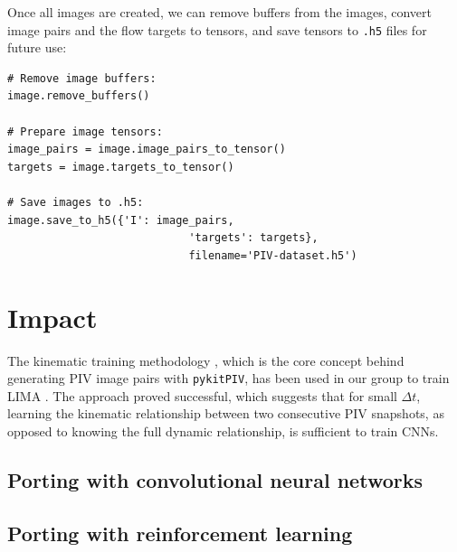 \documentclass[a4paper,fleqn]{cas-dc}
\newcommand{ \kamila}[1]{\color{blue}{Kamila: #1} \color{black}}
\begin{document}
Once all images are created, we can remove buffers from the images, convert image pairs and the flow targets to tensors, and save tensors to \texttt{.h5} files for future use:
\lstset{language=Python}
\begin{lstlisting}
# Remove image buffers:
image.remove_buffers()

# Prepare image tensors:
image_pairs = image.image_pairs_to_tensor()
targets = image.targets_to_tensor()

# Save images to .h5:
image.save_to_h5({'I': image_pairs, 
							'targets': targets}, 
							filename='PIV-dataset.h5')
\end{lstlisting}

\section{Impact} \label{sec:results}

The kinematic training methodology \cite{manickathan2022kinematic}, which is the core concept behind generating PIV image pairs with \texttt{pykitPIV}, has been used in our group to train LIMA \cite{manickathan2023lightweight, mucignat2023lightweight}. The approach proved successful, which suggests that for small $\Delta t$, learning the kinematic relationship between two consecutive PIV snapshots, as opposed to knowing the full dynamic relationship, is sufficient to train CNNs.




\kamila{It would be great if we could extend image generation to synthetic event-based camera datasets. This would make the software truly novel.}

\kamila{Perhaps a nice novelty would be to allow the user to add solid boundaries into the image?}


\subsection{Porting with convolutional neural networks}

\kamila{Here we can describe what can be achieved in terms of training a CNN.}

\subsection{Porting with reinforcement learning}

\kamila{Here we can describe what can be achieved in terms of training an RL agent, e.g. in the context of autonomous experimentation. Maybe the agent will learn to augment the dataset in real time to account for changing experimental settings.}
\end{document}
